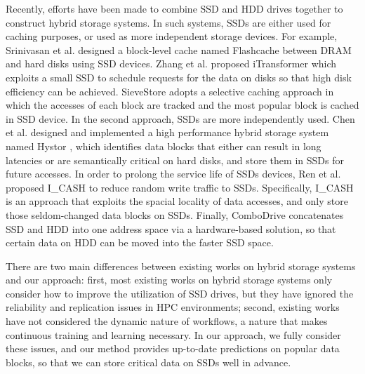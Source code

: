 Recently, efforts have been made to combine SSD and HDD drives together to construct hybrid storage systems. In such systems, SSDs are either used for caching purposes, or used as more independent storage devices. For example, Srinivasan et al. designed a block-level cache named Flashcache \cite{Flashcache} between DRAM and hard disks using SSD devices. Zhang et al.
proposed iTransformer \cite{Zhang2012} which exploits a small SSD to schedule requests for the data on disks so that high disk efficiency can be achieved. SieveStore \cite{Pritchett2010} adopts a selective caching approach in which the accesses of each block are tracked and the most popular block is cached in SSD device. In the second approach, SSDs are more independently used. Chen et al. designed and implemented a high performance hybrid storage system named Hystor \cite{Chen2011}, which identifies data blocks that either can result in long latencies or are semantically critical on hard disks, and store them in SSDs for future accesses. In order to prolong the service life of SSDs devices, Ren et al. proposed I\_CASH \cite{Yang2011} to reduce random write traffic to SSDs. Specifically, I\_CASH is an approach that exploits the spacial locality of data accesses, and only store those seldom-changed data blocks on SSDs. Finally, ComboDrive \cite{Payer2009} concatenates SSD and HDD into one address space via a hardware-based solution, so that certain data on HDD can be moved into the faster SSD space.

There are two main differences between existing works on hybrid storage systems and our approach: first, most existing works on hybrid storage systems only consider how to improve the utilization of SSD drives, but they have ignored the reliability and replication issues in HPC environments; second, existing works have not considered the dynamic nature of workflows, a nature that makes continuous training and learning necessary. In our approach, we fully consider these issues, and our method provides up-to-date predictions on popular data blocks, so that we can store critical data on SSDs well in advance.
